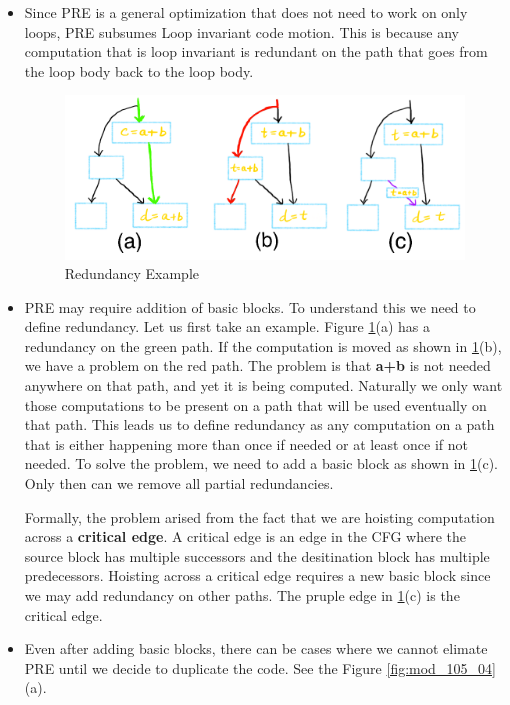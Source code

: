 \begin {itemize}
\item Since PRE is a general optimization that does not need to work on only loops, PRE subsumes Loop invariant code motion. This is because
any computation that is loop invariant is redundant on the path that goes from the loop body back to the loop body.  

\begin{figure}[h]
\centering
\includegraphics[scale = 0.3]{images/mod_105_fig3.png}
\caption{Redundancy Example}
\label {fig:mod_105_03}
\end{figure}

\item PRE may require addition of basic blocks. To understand this we need to define redundancy. Let us first take an example. Figure 
\ref{fig:mod_105_03}(a) has a redundancy on the green path. If the computation is moved as shown in \ref{fig:mod_105_03}(b), we have
a problem on the red path. The problem is that \textbf{a+b} is not needed anywhere on that path, and yet it is being computed. Naturally we
only want those computations to be present on a path that will be used eventually on that path. This leads us to define redundancy as 
any computation on a path that is either happening more than once if needed or at least once if not needed. To solve the problem, we need 
to add a basic block as shown in \ref{fig:mod_105_03}(c). Only then can we remove all partial redundancies.

Formally, the problem arised from the fact that we are hoisting computation across a \textbf{critical edge}. A critical edge is an edge
in the CFG where the source block has multiple successors and the desitination block has multiple predecessors. Hoisting across a critical
edge requires a new basic block since we may add redundancy on other paths. The pruple edge in \ref{fig:mod_105_03}(c) is the critical edge.

\item Even after adding basic blocks, there can be cases where we cannot elimate PRE until we decide to duplicate the code. See the 
Figure \ref{fig:mod_105_04}(a).


\end{itemize}
